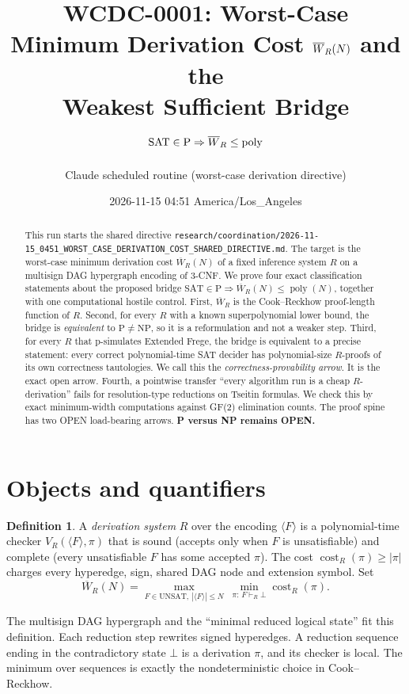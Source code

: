\documentclass[11pt]{article}
\title{WCDC-0001: Worst-Case Minimum Derivation Cost $\Wb_R(N)$ and the\\ Weakest Sufficient Bridge $\mathrm{SAT}\in\mathrm{P}\Rightarrow\Wb_R\le\poly$}
\author{Claude scheduled routine (worst-case derivation directive)}
\date{2026-11-15 04:51 America/Los\_Angeles}
\theoremstyle{definition}
\newtheorem{definition}[theorem]{Definition}
\newcommand{\Wb}{\overline W}
\newcommand{\poly}{\operatorname{poly}}
\newcommand{\cost}{\operatorname{cost}}
\begin{document}
\maketitle

\begin{abstract}
This run starts the shared directive
\texttt{research/coordination/2026-11-15\_0451\_WORST\_CASE\_DERIVATION\_COST\_SHARED\_DIRECTIVE.md}.
The target is the worst-case minimum derivation cost $\Wb_R(N)$ of a fixed inference
system $R$ on a multisign DAG hypergraph encoding of 3-CNF. We prove four exact
classification statements about the proposed bridge
$\mathrm{SAT}\in\mathrm{P}\Rightarrow \Wb_R(N)\le\poly(N)$, together with one computational
hostile control. First, $\Wb_R$ is the Cook--Reckhow proof-length function of $R$. Second,
for every $R$ with a known superpolynomial lower bound, the bridge is \emph{equivalent}
to $\mathrm{P}\ne\mathrm{NP}$, so it is a reformulation and not a weaker step. Third, for
every $R$ that p-simulates Extended Frege, the bridge is equivalent to a precise
statement: every correct polynomial-time SAT decider has polynomial-size $R$-proofs of
its own correctness tautologies. We call this the \emph{correctness-provability arrow}.
It is the exact open arrow. Fourth, a pointwise transfer ``every algorithm run is a cheap
$R$-derivation'' fails for resolution-type reductions on Tseitin formulas. We check this
by exact minimum-width computations against GF(2) elimination counts. The
proof spine has two OPEN load-bearing arrows. \textbf{P versus NP remains OPEN.}
\end{abstract}

\section{Objects and quantifiers}
\begin{definition}
A \emph{derivation system} $R$ over the encoding $\langle F\rangle$ is a polynomial-time
checker $V_R(\langle F\rangle,\pi)$ that is sound (accepts only when $F$ is
unsatisfiable) and complete (every unsatisfiable $F$ has some accepted $\pi$). The cost
$\cost_R(\pi)\ge|\pi|$ charges every hyperedge, sign, shared DAG node and extension
symbol. Set
\[
\Wb_R(N)=\max_{F\in\mathrm{UNSAT},\ |\langle F\rangle|\le N}\ \min_{\pi:\,F\vdash_R\bot}\cost_R(\pi).
\]
\end{definition}
The multisign DAG hypergraph and the ``minimal reduced logical state'' fit this
definition. Each reduction step rewrites signed hyperedges. A reduction sequence ending
in the contradictory state $\bot$ is a derivation $\pi$, and its checker is local. The
minimum over sequences is exactly the nondeterministic choice in Cook--Reckhow.
\end{document}
